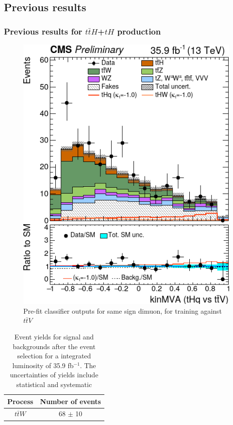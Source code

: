 \documentclass[11pt]{beamer}
\begin{document}
{\nologo
\begin{frame}
\subsection{Previous results}
\frametitle{Previous results for $t\bar{t}H$+$tH$ production}
\begin{minipage}[c]{0.45\textwidth}
\begin{figure}
	\centering
	\includegraphics[scale=0.3]{figures/histo.png}
	\caption*{\tiny{Pre-fit classifier outputs for same sign dimuon, for training against $t\bar{t}V$ }}
\end{figure}
\end{minipage}
\hfill
\begin{minipage}[c]{.45\textwidth}
	\small
\begin{table}
	\centering
	\caption*{\tiny{Event yields for signal and backgrounds after the event selection for a integrated luminosity of 35.9 fb$^{-1}$. The uncertainties of yields include statistical and systematic \protect \footnotemark} }
	\begin{tabular}{cc}
		\hline
		Process & Number of events \\
		\hline
		$t\bar{t}W$ & 68 $\pm$ 10 \\

\end{tabular}
\end{table}
\end{minipage}
\end{frame}}
\end{document}
